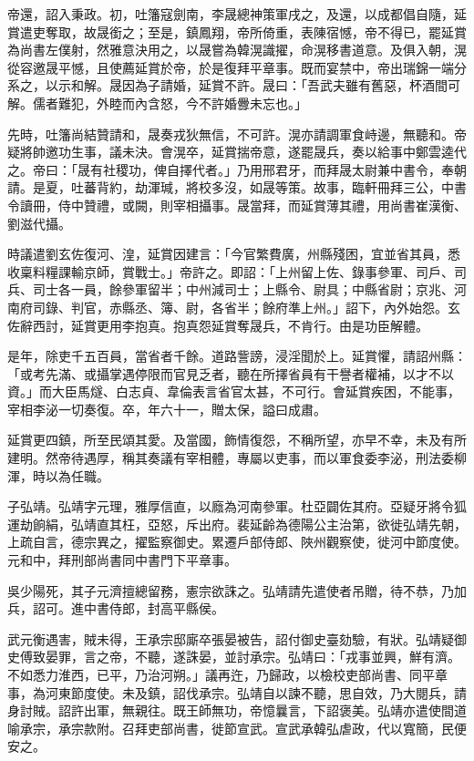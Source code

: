 \begin{pinyinscope}
 帝還，詔入秉政。初，吐籓寇劍南，李晟總神策軍戌之，及還，以成都倡自隨，延賞遣吏奪取，故晟銜之；至是，鎮鳳翔，帝所倚重，表陳宿憾，帝不得已，罷延賞為尚書左僕射，然雅意決用之，以晟嘗為韓滉識擢，命滉移書道意。及俱入朝，滉從容邀晟平憾，且使薦延賞於帝，於是復拜平章事。既而宴禁中，帝出瑞錦一端分系之，以示和解。晟因為子請婚，延賞不許。晟曰：「吾武夫雖有舊惡，杯酒間可解。儒者難犯，外睦而內含怒，今不許婚釁未忘也。」



 先時，吐籓尚結贊請和，晟奏戎狄無信，不可許。滉亦請調軍食峙邊，無聽和。帝疑將帥邀功生事，議未決。會滉卒，延賞揣帝意，遂罷晟兵，奏以給事中鄭雲逵代之。帝曰：「晟有社稷功，俾自擇代者。」乃用邢君牙，而拜晟太尉兼中書令，奉朝請。是夏，吐蕃背約，劫渾瑊，將校多沒，如晟等策。故事，臨軒冊拜三公，中書令讀冊，侍中贊禮，或闕，則宰相攝事。晟當拜，而延賞薄其禮，用尚書崔漢衡、劉滋代攝。



 時議遣劉玄佐復河、湟，延賞因建言：「今官繁費廣，州縣殘困，宜並省其員，悉收稟料糧課輸京師，賞戰士。」帝許之。即詔：「上州留上佐、錄事參軍、司戶、司兵、司士各一員，餘參軍留半；中州減司士；上縣令、尉具；中縣省尉；京兆、河南府司錄、判官，赤縣丞、簿、尉，各省半；餘府準上州。」詔下，內外始怨。玄佐辭西討，延賞更用李抱真。抱真怨延賞奪晟兵，不肯行。由是功臣解體。



 是年，除吏千五百員，當省者千餘。道路訾謗，浸淫聞於上。延賞懼，請詔州縣：「或考先滿、或攝掌遇停限而官見乏者，聽在所擇省員有干譽者權補，以才不以資。」而大臣馬燧、白志貞、韋倫表言省官太甚，不可行。會延賞疾困，不能事，宰相李泌一切奏復。卒，年六十一，贈太保，謚曰成肅。



 延賞更四鎮，所至民頌其愛。及當國，飾情復怨，不稱所望，亦早不幸，未及有所建明。然帝待遇厚，稱其奏議有宰相體，專屬以吏事，而以軍食委李泌，刑法委柳渾，時以為任職。



 子弘靖。弘靖字元理，雅厚信直，以廕為河南參軍。杜亞闢佐其府。亞疑牙將令狐運劫餉絹，弘靖直其枉，亞怒，斥出府。裴延齡為德陽公主治第，欲徙弘靖先朝，上疏自言，德宗異之，擢監察御史。累遷戶部侍郎、陜州觀察使，徙河中節度使。元和中，拜刑部尚書同中書門下平章事。



 吳少陽死，其子元濟擅總留務，憲宗欲誅之。弘靖請先遣使者吊贈，待不恭，乃加兵，詔可。進中書侍郎，封高平縣侯。



 武元衡遇害，賊未得，王承宗邸廝卒張晏被告，詔付御史臺劾驗，有狀。弘靖疑御史傅致晏罪，言之帝，不聽，遂誅晏，並討承宗。弘靖曰：「戎事並興，鮮有濟。不如悉力淮西，已平，乃治河朔。」議再迕，乃歸政，以檢校吏部尚書、同平章事，為河東節度使。未及鎮，詔伐承宗。弘靖自以諫不聽，思自效，乃大閱兵，請身討賊。詔許出軍，無親往。既王師無功，帝憶曩言，下詔褒美。弘靖亦遣使間道喻承宗，承宗款附。召拜吏部尚書，徙節宣武。宣武承韓弘虐政，代以寬簡，民便安之。




\end{pinyinscope}
